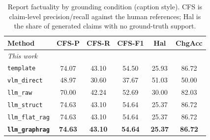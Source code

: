 \begin{table}[t]
\centering
\caption{Report factuality by grounding condition (caption style). CFS is claim-level precision/recall against the human references; Hal is the share of generated claims with no ground-truth support.}
\label{tab:factuality_caption}
\setlength{\tabcolsep}{3pt}
\begin{tabular}{lccccc}
\toprule
Method & CFS-P & CFS-R & CFS-F1 & Hal & ChgAcc \\
\midrule
\multicolumn{6}{l}{\emph{This work}} \\
\texttt{template} & 74.07 & 43.10 & 54.50 & 25.93 & 86.72 \\
\texttt{vlm\_direct} & 48.97 & 30.60 & 37.67 & 51.03 & 50.00 \\
\texttt{llm\_raw} & 70.00 & 42.24 & 52.69 & 30.00 & 82.03 \\
\texttt{llm\_struct} & 74.63 & 43.10 & 54.64 & 25.37 & 86.72 \\
\texttt{llm\_flat\_rag} & 74.63 & 43.10 & 54.64 & 25.37 & 86.72 \\
\textbf{\texttt{llm\_graphrag}} & \textbf{74.63} & \textbf{43.10} & \textbf{54.64} & \textbf{25.37} & \textbf{86.72} \\
\bottomrule
\end{tabular}
\end{table}

